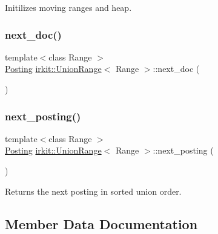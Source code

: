 Initilizes moving ranges and heap. 

\mbox{\label{classirkit_1_1UnionRange_a9161a468e74df4e76cd04104763f7d97}} 
\subsubsection{\texorpdfstring{next\+\_\+doc()}{next\_doc()}}
{\footnotesize\ttfamily template$<$class Range $>$ \\
\hyperlink{classirkit_1_1UnionRange_a5f694970419f5a60d7fd41d740556229}{Posting} \hyperlink{classirkit_1_1UnionRange}{irkit\+::\+Union\+Range}$<$ Range $>$\+::next\+\_\+doc (\begin{DoxyParamCaption}{ }\end{DoxyParamCaption})\hspace{0.3cm}{\ttfamily [inline]}}

\mbox{\label{classirkit_1_1UnionRange_aedb2ab6f4a5f0b9f57cf2c55214ed42e}} 
\subsubsection{\texorpdfstring{next\+\_\+posting()}{next\_posting()}}
{\footnotesize\ttfamily template$<$class Range $>$ \\
\hyperlink{classirkit_1_1UnionRange_a5f694970419f5a60d7fd41d740556229}{Posting} \hyperlink{classirkit_1_1UnionRange}{irkit\+::\+Union\+Range}$<$ Range $>$\+::next\+\_\+posting (\begin{DoxyParamCaption}{ }\end{DoxyParamCaption})\hspace{0.3cm}{\ttfamily [inline]}}



Returns the next posting in sorted union order. 



\subsection{Member Data Documentation}
\mbox{\label{classirkit_1_1UnionRange_a613eebb9b7b8601bffdad1d842c8c7f0}} 

